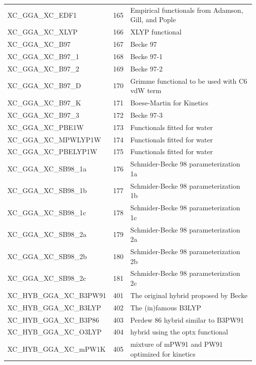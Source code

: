 \documentclass[a4paper,11pt]{report}
\begin{document}
\begin{longtable}{lrl}
   XC\_GGA\_XC\_EDF1          & 165  &  Empirical functionals from Adamson, Gill, and Pople \\
   XC\_GGA\_XC\_XLYP          & 166  &  XLYP functional \\
   XC\_GGA\_XC\_B97           & 167  &  Becke 97                                 \\
   XC\_GGA\_XC\_B97\_1        & 168  &  Becke 97-1                               \\
   XC\_GGA\_XC\_B97\_2        & 169  &  Becke 97-2                               \\
   XC\_GGA\_XC\_B97\_D        & 170  &  Grimme functional to be used with C6 vdW term \\
   XC\_GGA\_XC\_B97\_K        & 171  &  Boese-Martin for Kinetics                \\
   XC\_GGA\_XC\_B97\_3        & 172  &  Becke 97-3                               \\
   XC\_GGA\_XC\_PBE1W         & 173  &  Functionals fitted for water \\
   XC\_GGA\_XC\_MPWLYP1W      & 174  &  Functionals fitted for water \\
   XC\_GGA\_XC\_PBELYP1W      & 175  &  Functionals fitted for water \\
   XC\_GGA\_XC\_SB98\_1a      & 176  &  Schmider-Becke 98 parameterization 1a    \\
   XC\_GGA\_XC\_SB98\_1b      & 177  &  Schmider-Becke 98 parameterization 1b    \\
   XC\_GGA\_XC\_SB98\_1c      & 178  &  Schmider-Becke 98 parameterization 1c    \\
   XC\_GGA\_XC\_SB98\_2a      & 179  &  Schmider-Becke 98 parameterization 2a    \\
   XC\_GGA\_XC\_SB98\_2b      & 180  &  Schmider-Becke 98 parameterization 2b    \\
   XC\_GGA\_XC\_SB98\_2c      & 181  &  Schmider-Becke 98 parameterization 2c    \\
   XC\_HYB\_GGA\_XC\_B3PW91   & 401  &  The original hybrid proposed by Becke \\
   XC\_HYB\_GGA\_XC\_B3LYP    & 402  &  The (in)famous B3LYP                  \\
   XC\_HYB\_GGA\_XC\_B3P86    & 403  &  Perdew 86 hybrid similar to B3PW91    \\
   XC\_HYB\_GGA\_XC\_O3LYP    & 404  &  hybrid using the optx functional \\
   XC\_HYB\_GGA\_XC\_mPW1K    & 405  &  mixture of mPW91 and PW91 optimized for kinetics \\

\end{longtable}
\end{document}
